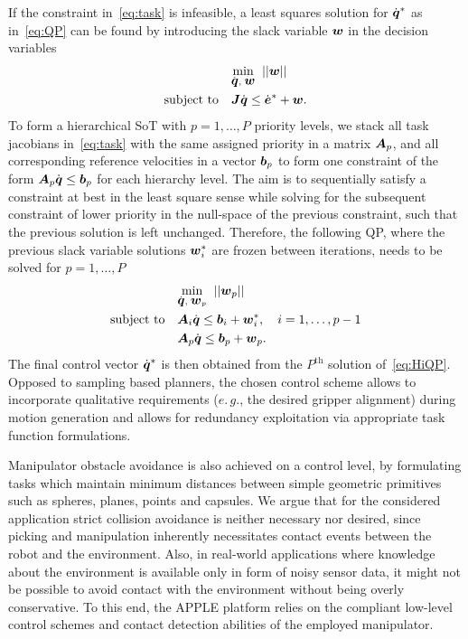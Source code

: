 If the constraint in~\eqref{eq:task} is infeasible, a least squares solution for $\dot{\mbox{\boldmath $q$}}^*$ as
in~\eqref{eq:QP} can be found by introducing the slack variable $\mbox{\boldmath $w$}$ in the decision variables
%
\begin{align}\label{eq:iQP}
  &\underset{\dot{\mbox{\boldmath $q$}},\;\mbox{\boldmath $w$}}{\mbox{min}}\;\;||\mbox{\boldmath $w$}||\\
   \mbox{subject to} \quad &\mbox{\boldmath $J$}\dot{\mbox{\boldmath $q$}} \leq \dot{\mbox{\boldmath $e$}}^* + \mbox{\boldmath $w$}. \nonumber
\end{align}
%
To form a hierarchical SoT with $p=1,\dots,P$ priority levels, we stack all task jacobians
in~\eqref{eq:task} with the same assigned priority in a matrix $\mbox{\boldmath $A$}_p$, and all corresponding
reference velocities in a vector $\mbox{\boldmath $b$}_p$ to form one constraint of the form
$\mbox{\boldmath $A$}_p\dot{\mbox{\boldmath $q$}}\leq \mbox{\boldmath $b$}_p$ for each hierarchy level. The aim is to sequentially satisfy
a constraint at best in the least square sense while solving for the subsequent constraint of lower
priority in the null-space of the previous constraint, such that the previous solution is left
unchanged. Therefore, the following QP, where the previous slack variable solutions $\mbox{\boldmath $w$}_i^*$
are frozen between iterations, needs to be solved for $p=1,\ldots,P$
%
\begin{align}\label{eq:HiQP}
  &\underset{\dot{\mbox{\boldmath $q$}},\;\mbox{\boldmath $w$}_p}{\mbox{min}}\;\;||\mbox{\boldmath $w$}_p||\\
   \mbox{subject to} \quad &\mbox{\boldmath $A$}_i\dot{\mbox{\boldmath $q$}} \leq \mbox{\boldmath $b$}_i + \mbox{\boldmath $w$}_i^*, \quad i=1,\dots,p-1 \nonumber \\
                           &\mbox{\boldmath $A$}_p\dot{\mbox{\boldmath $q$}} \leq \mbox{\boldmath $b$}_p + \mbox{\boldmath $w$}_p.  \nonumber 
\end{align}
%
The final control vector $\dot{\mbox{\boldmath $q$}}^*$ is then obtained from the $P^{\mbox{th}}$ solution
of~\eqref{eq:HiQP}. Opposed to sampling based planners, the chosen control scheme allows to
incorporate qualitative requirements ($e.\,g.$, the desired gripper alignment) during motion
generation and allows for redundancy exploitation via appropriate task function formulations.

Manipulator obstacle avoidance is also achieved on a control level, by formulating tasks which
maintain minimum distances between simple geometric primitives such as spheres, planes, points and
capsules. We argue that for the considered application strict collision avoidance is neither
necessary nor desired, since picking and manipulation inherently necessitates contact events between
the robot and the environment. Also, in real-world applications where knowledge about the
environment is available only in form of noisy sensor data, it might not be possible to avoid
contact with the environment without being overly conservative. To this end, the APPLE platform
relies on the compliant low-level control schemes and contact detection abilities of the employed
manipulator.
%
